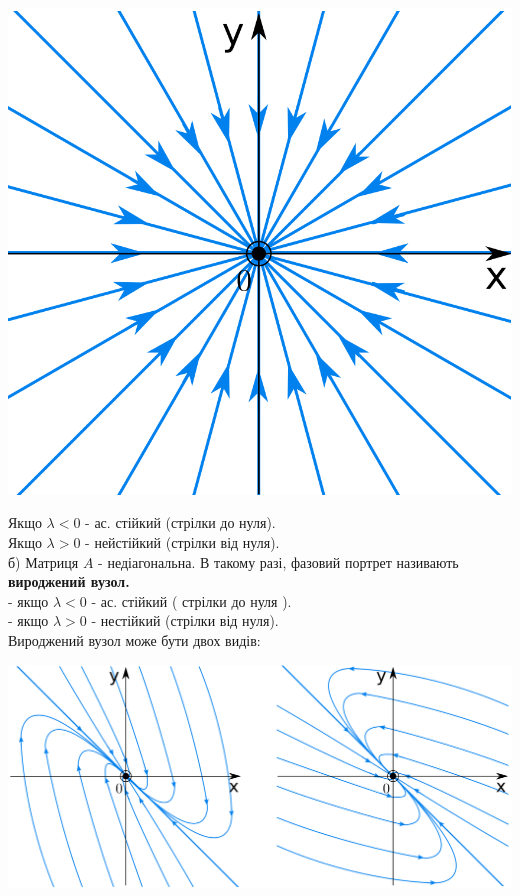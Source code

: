\begin{center} \includegraphics[scale=0.3]{assets/lectures_recent-ab36e3f3.png} \end{center}


Якщо $ \lambda < 0 $ - ас. стійкий (стрілки до нуля).\\
Якщо $ \lambda > 0 $ - нейстійкий (стрілки від нуля). \\
б) Матриця $A$ - недіагональна. В такому разі, фазовий портрет називають \textbf{вироджений вузол.}\\
- якщо $ \lambda < 0 $ - ас. стійкий ( стрілки до нуля ).\\
- якщо $ \lambda > 0 $ - нестійкий (стрілки від нуля).\\
Вироджений вузол може бути двох видів:
\begin{center} \includegraphics[scale=0.25]{assets/lectures_recent-b526bf37.png} \end{center}

